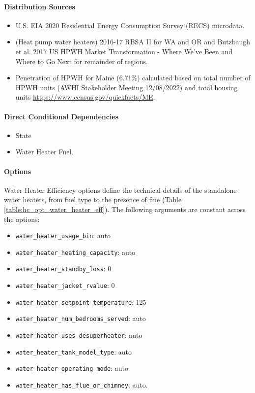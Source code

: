 \paragraph{Distribution Sources}
\begin{itemize}
\item
  U.S. EIA 2020 Residential Energy Consumption Survey (RECS) microdata.
\item
  (Heat pump water heaters) 2016-17 RBSA II for WA and OR and Butzbaugh
  et al. 2017 US HPWH Market Transformation - Where
  We've Been and Where to Go Next for remainder of
  regions.
\item
  Penetration of HPWH for Maine (6.71\%) calculated based on total
  number of HPWH units (AWHI Stakeholder Meeting 12/08/2022) and total
  housing units \url{https://www.census.gov/quickfacts/ME}.
\end{itemize}

\paragraph{Direct Conditional Dependencies}
\begin{itemize}
\item State
\item Water Heater Fuel.
\end{itemize}

\paragraph{Options}
Water Heater Efficiency options define the technical details of the standalone water heaters, from fuel type to the presence of flue (Table \ref{table:hc_opt_water_heater_eff}).  The following arguments are constant across the options:

\begin{itemize}
    \item \texttt{water\_heater\_usage\_bin}: auto
    \item \texttt{water\_heater\_heating\_capacity}: auto
    \item \texttt{water\_heater\_standby\_loss}: 0
    \item \texttt{water\_heater\_jacket\_rvalue}: 0
    \item \texttt{water\_heater\_setpoint\_temperature}: 125
    \item \texttt{water\_heater\_num\_bedrooms\_served}: auto
    \item \texttt{water\_heater\_uses\_desuperheater}: auto
    \item \texttt{water\_heater\_tank\_model\_type}: auto
    \item \texttt{water\_heater\_operating\_mode}: auto
    \item \texttt{water\_heater\_has\_flue\_or\_chimney}: auto.
\end{itemize}

